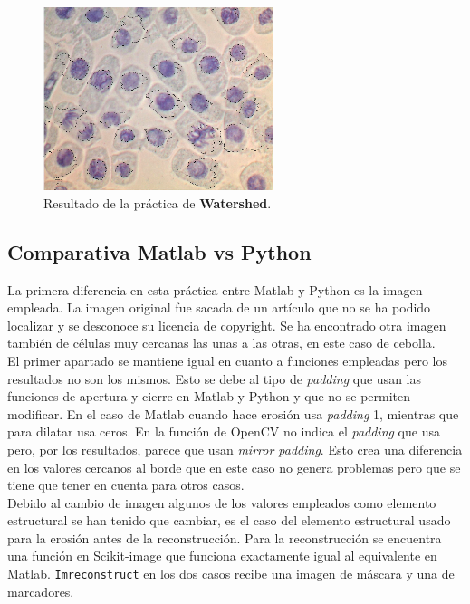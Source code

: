 \documentclass[a4paper,12pt]{report}
\begin{document}
\begin{figure}[h]
\centering
\includegraphics[width=0.6\textwidth]{imagenes/finalwatershed}
\caption{Resultado de la práctica de \textbf{Watershed}.}
\label{finalwatershed} 
\end{figure}



\subsection{Comparativa Matlab vs Python}

La primera diferencia en esta práctica entre Matlab y Python es la imagen empleada. La imagen original fue sacada de un artículo que no se ha podido localizar y se desconoce su licencia de copyright. Se ha encontrado otra imagen también de células muy cercanas las unas a las otras, en este caso de cebolla.\\

El primer apartado se mantiene igual en cuanto a funciones empleadas pero los resultados no son los mismos. Esto se debe al tipo de \emph{padding} que usan las funciones de apertura y cierre en Matlab y Python y que no se permiten modificar. En el caso de Matlab cuando hace erosión usa \emph{padding} 1, mientras que para dilatar usa ceros. En la función de OpenCV no indica el \emph{padding} que usa pero, por los resultados, parece que usan \emph{mirror padding}. Esto crea una diferencia en los valores cercanos al borde que en este caso no genera problemas pero que se tiene que tener en cuenta para otros casos.\\

Debido al cambio de imagen algunos de los valores empleados como elemento estructural se han tenido que cambiar, es el caso del elemento estructural usado para la erosión antes de la reconstrucción. Para la reconstrucción se encuentra una función en Scikit-image que funciona exactamente igual al equivalente en Matlab. \texttt{Imreconstruct} en los dos casos recibe una imagen de máscara y una de marcadores.\\
\end{document}
